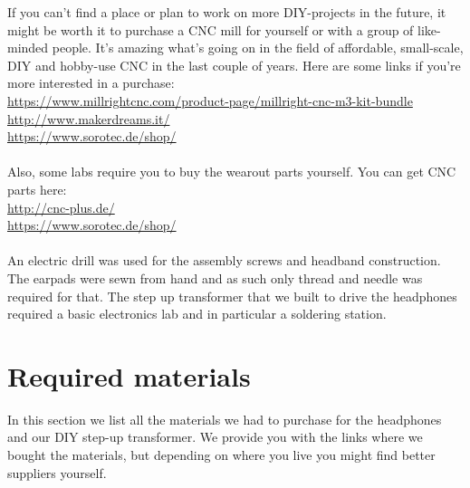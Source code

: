 \documentclass{article}
\begin{document}
If you can't find a place or plan to work on more DIY-projects in the future, it might be worth it to purchase a CNC mill for yourself or with a group of like-minded people. It's amazing what's going on in the field of affordable, small-scale, DIY and hobby-use CNC in the last couple of years. Here are some links if you're more interested in a purchase:\\
\url{https://www.millrightcnc.com/product-page/millright-cnc-m3-kit-bundle}\\
\url{http://www.makerdreams.it/}\\
\url{https://www.sorotec.de/shop/}\\
\\
Also, some labs require you to buy the wearout parts yourself. You can get CNC parts here:\\
\url{http://cnc-plus.de/}\\
\url{https://www.sorotec.de/shop/}\\
\\
An electric drill was used for the assembly screws and headband construction. The earpads were sewn from hand and as such only thread and needle was required for that. The step up transformer that we built to drive the headphones required a basic electronics lab and in particular a soldering station.

\section{Required materials}
\label{s:materials}
In this section we list all the materials we had to purchase for the headphones and our DIY step-up transformer. We provide you with the links where we bought the materials, but depending on where you live you might find better suppliers yourself.
\end{document}
